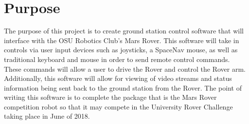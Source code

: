 \section{Purpose}
The purpose of this project is to create ground station control software that will interface with the OSU Robotics Club's Mars Rover.
This software will take in controls via user input devices such as joysticks, a SpaceNav mouse, as well as traditional keyboard and mouse in order to send remote control commands.
These commands will allow a user to drive the Rover and control the Rover arm.
Additionally, this software will allow for viewing of video streams and status information being sent back to the ground station from the Rover.
The point of writing this software is to complete the package that is the Mars Rover competition robot so that it may compete in the University Rover Challenge taking place in June of 2018.
